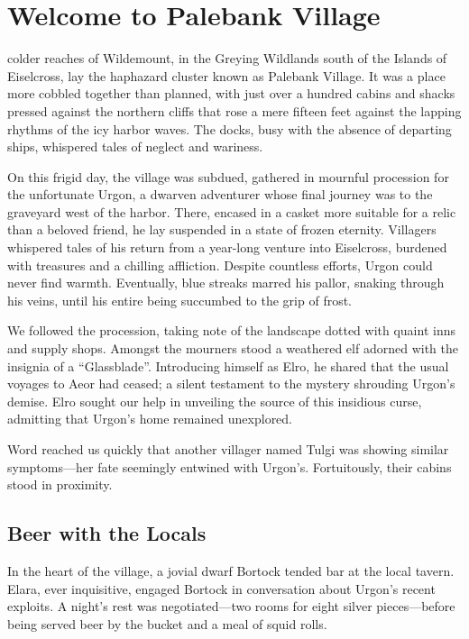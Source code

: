 \documentclass[
  12pt,twoside,twocolumn,openany,nodeprecatedcode]{dndbook}
\begin{document}
\chapter{Welcome to Palebank Village}\label{welcome-to-palebank-village}

 colder reaches of
Wildemount, in the Greying Wildlands south of the Islands of Eiselcross,
lay the haphazard cluster known as Palebank Village. It was a place more
cobbled together than planned, with just over a hundred cabins and
shacks pressed against the northern cliffs that rose a mere fifteen feet
against the lapping rhythms of the icy harbor waves. The docks, busy
with the absence of departing ships, whispered tales of neglect and
wariness.

On this frigid day, the village was subdued, gathered in mournful
procession for the unfortunate Urgon, a dwarven adventurer whose final
journey was to the graveyard west of the harbor. There, encased in a
casket more suitable for a relic than a beloved friend, he lay suspended
in a state of frozen eternity. Villagers whispered tales of his return
from a year-long venture into Eiselcross, burdened with treasures and a
chilling affliction. Despite countless efforts, Urgon could never find
warmth. Eventually, blue streaks marred his pallor, snaking through his
veins, until his entire being succumbed to the grip of frost.

We followed the procession, taking note of the landscape dotted with
quaint inns and supply shops. Amongst the mourners stood a weathered elf
adorned with the insignia of a ``Glassblade''. Introducing himself as
Elro, he shared that the usual voyages to Aeor had ceased; a silent
testament to the mystery shrouding Urgon's demise. Elro sought our help
in unveiling the source of this insidious curse, admitting that Urgon's
home remained unexplored.

Word reached us quickly that another villager named Tulgi was showing
similar symptoms---her fate seemingly entwined with Urgon's.
Fortuitously, their cabins stood in proximity.

\section{Beer with the Locals}\label{beer-with-the-locals}

In the heart of the village, a jovial dwarf Bortock tended bar at the
local tavern. Elara, ever inquisitive, engaged Bortock in conversation
about Urgon's recent exploits. A night's rest was negotiated---two rooms
for eight silver pieces---before being served beer by the bucket and a
meal of squid rolls.
\end{document}

